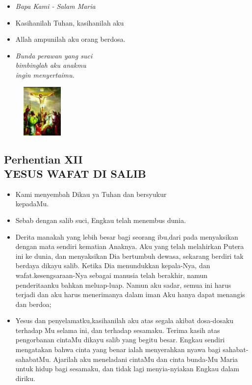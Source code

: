 \documentclass[a5paper,headsepline,titlepage,10pt,nnormalheadings,DIVcalc]{scrbook}
\newcommand{\BU}[1]{\begin{itemize} \item[U:] #1 \end{itemize}}
\newcommand{\BP}[1]{\begin{itemize} \item[P:] #1 \end{itemize}}
\begin{document}
\large\begin{itemize}\item[~]\it{Bapa Kami - Salam Maria}\end{itemize}\normalsize
\BP{Kasihanilah Tuhan, kasihanilah aku}
   \BU{Allah ampunilah aku orang berdosa.}

\begin{itemize}
\item[11.] \it{Bunda perawan yang suci\\bimbinglah aku anakmu\\
      ingin menyertaimu.
}\end{itemize}

\begin{figure}
\includegraphics[width=2cm]{jalansalib_files/12_small.jpg}
\end{figure}
\subsection*{Perhentian XII\\
YESUS WAFAT DI SALIB}

\BP{   Kami menyembah Dikau ya Tuhan dan bersyukur\\kepadaMu.}
\BU{   Sebab dengan salib suci, Engkau telah menembus dunia.}

\BP{ Derita manakah yang lebih besar bagi seorang ibu,dari pada menyaksikan dengan mata sendiri kematian Anaknya. Aku yang telah melahirkan Putera ini ke dunia, dan menyaksikan Dia bertumbuh dewasa, sekarang berdiri tak berdaya dikayu salib. Ketika Dia menundukkan kepala-Nya, dan wafat.kesengsaraan-Nya sebagai manusia telah berakhir, namun penderitaanku bahkan meluap-luap. Namun aku sadar, semua ini harus terjadi dan aku harus menerimanya dalam iman Aku hanya dapat menangis dan berdoa;}

\BU{Yesus dan penyelamatku,kasihanilah aku atas segala akibat dosa-dosaku terhadap Mu selama ini, dan terhadap sesamaku. Terima kasih atas pengorbanan cintaMu dikayu salib yang begitu besar. Engkau sendiri mengatakan bahwa cinta yang benar   ialah menyerahkan nyawa bagi sahabat-sahabatMu. Ajarilah aku meneladani cintaMu dan cinta bunda-Mu Maria untuk hidup bagi sesamaku, dan tidak lagi menyia-nyiakan Engkau dalam diriku.}
\end{document}
